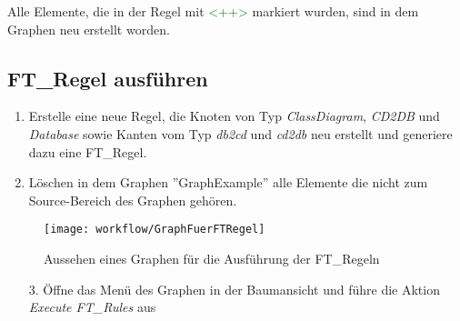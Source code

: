 		Alle Elemente, die in der Regel mit \textcolor{green}{<++>} markiert wurden, sind in dem Graphen neu erstellt worden.
		
		\subsection{FT\_Regel ausführen}
		\begin{enumerate}
			\item Erstelle eine neue Regel, die Knoten von Typ \textit{ClassDiagram}, \textit{CD2DB} und \textit{Database} sowie Kanten vom Typ \textit{db2cd} und \textit{cd2db} neu erstellt und generiere dazu eine FT\_Regel.
			\item Löschen in dem Graphen ''GraphExample'' alle Elemente die nicht zum Source-Bereich des Graphen gehören.
		
		\end{enumerate}
			\begin{figure}[h!] %
				\centering
				\texttt{[image: workflow/GraphFuerFTRegel]}
				\caption{Aussehen eines Graphen für die Ausführung der FT\_Regeln}
				\label{fig:graphFuerFTRegel}
			\end{figure}	
		\begin{enumerate}
			\item[3.] Öffne das Menü des Graphen in der Baumansicht und führe die Aktion \textit{Execute FT\_Rules} aus
		\end{enumerate}

\clearpage

